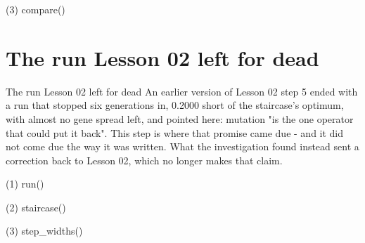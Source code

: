\begin{frame}[fragile]{(3) compare()}

\end{frame}


\section{The run Lesson 02 left for dead}

\begin{frame}{The run Lesson 02 left for dead}
An earlier version of Lesson 02 step 5 ended with a run that stopped six
generations in, 0.2000 short of the staircase's optimum, with almost no gene
spread left, and pointed here: mutation "is the one operator that could put it
back". This step is where that promise came due - and it did not come due the way
it was written. What the investigation found instead sent a correction back to
Lesson 02, which no longer makes that claim.
\end{frame}

\begin{frame}[fragile]{(1) run()}

\end{frame}

\begin{frame}[fragile]{(2) staircase()}

\end{frame}

\begin{frame}[fragile]{(3) step\_widths()}

\end{frame}

